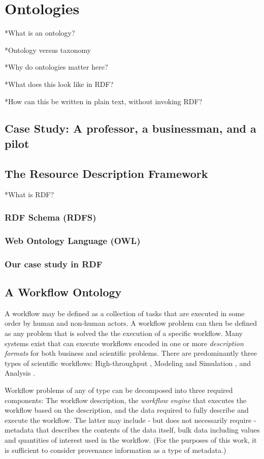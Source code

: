\chapter{Ontologies} \label{ch:ontologies}

*What is an ontology?

*Ontology versus taxonomy

*Why do ontologies matter here?

*What does this look like in RDF?

*How can this be written in plain text, without invoking RDF?

\section{Case Study: A professor, a businessman, and a pilot}

\section{The Resource Description Framework}

*What is RDF?

\subsection{RDF Schema (RDFS)}

\subsection{Web Ontology Language (OWL)}

\subsection{Our case study in RDF}

\section{A Workflow Ontology}

A workflow may be defined as a collection of tasks that are executed in some order by human and non-human actors. A workflow problem can then be defined as any problem that is solved the the execution of a specific workflow. Many systems exist that can execute workflows encoded in one or more \textit{description formats} for both business and scientific problems. There are predominantly three types of scientific workflows: High-throughput \cite{}, Modeling and Simulation \cite{}, and Analysis \cite{}.

Workflow problems of any of type can be decomposed into three required components: The workflow description, the \textit{workflow engine} that executes the workflow based on the description, and the data required to fully describe and execute the workflow. The latter may include - but does not necessarily require - metadata that describes the contents of the data itself, bulk data including values and quantities of interest used in the workflow. (For the purposes of this work, it is sufficient to consider provenance information as a type of metadata.)